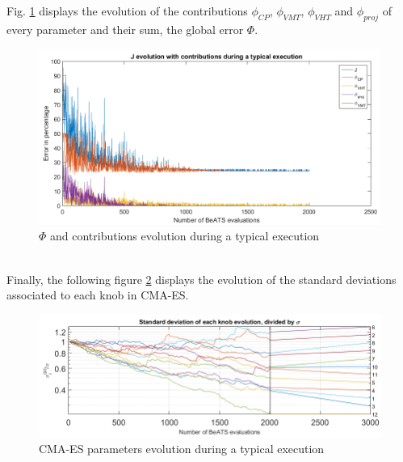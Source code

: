 \newpage
Fig. \ref{fig:contributionsexample} displays the evolution of the contributions $\phi_{CP}$, $\phi_{VMT}$, $\phi_{VHT}$ and $\phi_{proj}$ of every parameter and their sum, the global error $\Phi$.\\
\begin{figure}[!h]
	\label{fig:contributionsexample}
	\caption{$\Phi$ and contributions evolution during a typical execution}
	\includegraphics[width=7in]{figures/results_figures/contributionsexample.png}
\end{figure}	
\\
Finally, the following figure \ref{fig:cmaesexample} displays the evolution of the standard deviations associated to each knob in CMA-ES.
\begin{figure}[!h]
	\caption{CMA-ES parameters evolution during a typical execution}
	\label{fig:cmaesexample}
	\includegraphics[width=7in]{figures/results_figures/cmaesexample.png}
\end{figure}	
\newpage

